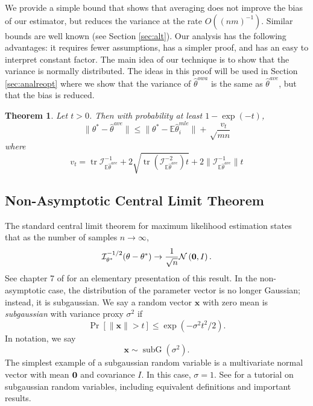 \documentclass[twoside]{article}
\newtheorem{theorem}{Theorem}
\DeclareMathOperator*{\subG}{subG}
\DeclareMathOperator*{\tr}{tr}
\newcommand{\zero}{\text{\textbf{0}}}
\newcommand{\E}{\mathbb{E}}
\newcommand{\x}{\mathbf{x}}
\newcommand{\w}{\theta}
\newcommand{\wowa}{\hat\w^{owa}}
\newcommand{\wave}{\hat\w^{ave}}
\newcommand{\wtave}{\E\hat\w^{ave}}
\newcommand{\wmle}{\hat\w^{mle}}
\newcommand{\wstar}{{\w^{*}}}
\newcommand{\I}{\mathcal I}
\newcommand{\normal}[2]{\ensuremath{\mathcal{N}\left({{#1}},{{#2}}\right)}}
\newcommand{\subnormal}[1]{\ensuremath{\subG\left({{#1}}\right)}}
\newcommand{\trans}[1]{\ensuremath{{#1}^{\mathsf{T}}}}
\newcommand{\ltwo}[1]{{\lVert {#1} \rVert}}
\newcommand{\prob}[1]{\Pr\left[{#1}\right]}
\begin{document}
We provide a simple bound that shows that averaging does not improve the bias of our estimator,
but reduces the variance at the rate $O((nm)^{-1})$.
Similar bounds are well known (see Section \ref{sec:alt}).
Our analysis has the following advantages:
it requires fewer assumptions, has a simpler proof, and has an easy to interpret constant factor.
The main idea of our technique is to show that the variance is normally distributed.
The ideas in this proof will be used in Section \ref{sec:analreopt} where we show that the variance of $\wowa$ is the same as $\wave$, but that the bias is reduced.
\begin{theorem}
Let $t>0$.
Then with probability at least $1-\exp(-t)$,
\begin{equation}
\ltwo{\wstar-\wave} \le \ltwo{\wstar-\E\wmle_i} + \sqrt\frac{v_t}{mn}
\end{equation}
where
\begin{equation}
v_t =
\tr{\I^{-1}_{\wtave}}
+ 2\sqrt{\tr \left({\I^{-2}_{\wtave}}\right)t}
+ 2\ltwo{\I^{-1}_{\wtave}}t
\end{equation}
\end{theorem}

\subsection {Non-Asymptotic Central Limit Theorem}

The standard central limit theorem for maximum likelihood estimation states that as the number of samples $n \to \infty$,
\begin{equation}
\I^{-1/2}_\wstar(\w-\wstar) \to \frac{1}{\sqrt n}\normal{\zero}{I}
.
\end{equation}
See chapter 7 of \cite{lehmann1999elements} for an elementary presentation of this result.
In the non-asymptotic case, the distribution of the parameter vector is no longer Gaussian;
instead, it is subgaussian.
We say a random vector $\x$ with zero mean is \emph{subgaussian} with variance proxy $\sigma^2$ if
\begin{equation}
\prob{\ltwo{\x} > t} \le \exp(-\sigma^2 t^2 /2)
.
\end{equation}
In notation, we say
\begin{equation}
\x \sim \subnormal{\sigma^2}
.
\end{equation}
The simplest example of a subgaussian random variable is a multivariate normal vector with mean $\zero$ and covariance $I$.
In this case, $\sigma=1$.
See \cite{vershynin2010introduction} for a tutorial on subgaussian random variables,
including equivalent definitions and important results.
\end{document}
